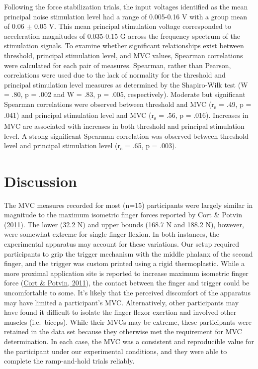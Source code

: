 \documentclass[]{cik}%
\begin{document}
Following the force stabilization trials, the input voltages identified
as the mean principal noise stimulation level had a range of 0.005-0.16
V with a group mean of 0.06 \(\pm\) 0.05 V. This mean principal
stimulation voltage corresponded to acceleration magnitudes of
0.035-0.15 G across the frequency spectrum of the stimulation signals.
To examine whether significant relationships exist between threshold,
principal stimulation level, and MVC values, Spearman correlations were
calculated for each pair of measures. Spearman, rather than Pearson,
correlations were used due to the lack of normality for the threshold
and principal stimulation level measures as determined by the
Shapiro-Wilk test (W = .80, p = .002 and W = .83, p = .005,
respectively). Moderate but significant Spearman correlations were
observed between threshold and MVC (r\textsubscript{s} = .49, p = .041)
and principal stimulation level and MVC (r\textsubscript{s} = .56, p =
.016). Increases in MVC are associated with increases in both threshold
and principal stimulation level. A strong significant Spearman
correlation was observed between threshold level and principal
stimulation level (r\textsubscript{s} = .65, p = .003).

\hypertarget{discussion}{%
\section{Discussion}\label{discussion}}

The MVC measures recorded for most (n=15) participants were largely
similar in magnitude to the maximum isometric finger forces reported by
Cort \& Potvin (\protect\hyperlink{ref-cort2011}{2011}). The lower (32.2
N) and upper bounds (168.7 N and 188.2 N), however, were somewhat
extreme for single finger flexion. In both instances, the experimental
apparatus may account for these variations. Our setup required
participants to grip the trigger mechanism with the middle phalanx of
the second finger, and the trigger was custom printed using a rigid
thermoplastic. While a more proximal application site is reported to
increase maximum isometric finger force
(\protect\hyperlink{ref-cort2011}{Cort \& Potvin, 2011}), the contact
between the finger and trigger could be uncomfortable to some. It's
likely that the perceived discomfort of the apparatus may have limited a
participant's MVC. Alternatively, other participants may have found it
difficult to isolate the finger flexor exertion and involved other
muscles (i.e.~biceps). While their MVCs may be extreme, these
participants were retained in the data set because they otherwise met
the requirement for MVC determination. In each case, the MVC was a
consistent and reproducible value for the participant under our
experimental conditions, and they were able to complete the
ramp-and-hold trials reliably.
\end{document}
